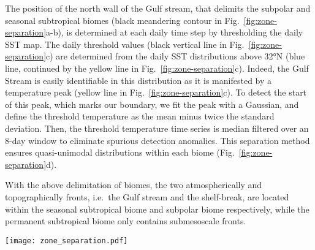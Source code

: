 The position of the north wall of the Gulf stream, that delimits the subpolar and seasonal subtropical biomes (black meandering contour in Fig.~\ref{fig:zone-separation}a-b), is determined at each daily time step by thresholding the daily SST map.
The daily threshold values (black vertical line in Fig.~\ref{fig:zone-separation}c) are determined from the daily SST distributions above 32°N (blue line, continued by the yellow line in Fig.~\ref{fig:zone-separation}c).
Indeed, the Gulf Stream is easily identifiable in this distribution as it is manifested by a temperature peak (yellow line in Fig.~\ref{fig:zone-separation}c).
To detect the start of this peak, which marks our boundary, we fit the peak with a Gaussian, and define the threshold temperature as the mean minus twice the standard deviation.
Then, the threshold temperature time series is median filtered over an 8-day window to eliminate spurious detection anomalies.
This separation method ensures quasi-unimodal  distributions within each biome (Fig.~\ref{fig:zone-separation}d).

With the above delimitation of biomes, the two atmospherically and topographically fronts, i.e.\ the Gulf stream and the shelf-break, are located within the seasonal subtropical biome and subpolar biome respectively, while the permanent subtropical biome only contains submesoscale fronts.

\begin{figure*}
  \texttt{[image: zone\_separation.pdf]}
  \caption{
    Delimitation of the three biomes in the Gulf stream extension region: the Permanent Subtropical Biome (PSB, south of the dashed line at 32°N), the Seasonal Subtropical Biome (SSB, between 32°N and the meandering Gulf stream northern wall on that day marked with the black contour), and the Subpolar Biome (PB, north of the Gulf stream northern wall).
    (a) SST and (b)  snapshots on the 22 April 2007 (with data masked by clouds in white), (c) SST and (d)   distribution within each biome for the same day (PB:\@blue, SSB:\@yellow, PSB:\@red).
    The black line in (c) shows the SST threshold value detected to delimit the Gulf Stream northern wall (see methods section).
    The x-axis of the distributions correspond to the x-axis scale of the corresponding color bars.
    The red line follows the 1500m isobath.
    Data on the continental shelf (< 1500m) is not considered here and have been masked.
  }%
  \label{fig:zone-separation}
\end{figure*}

